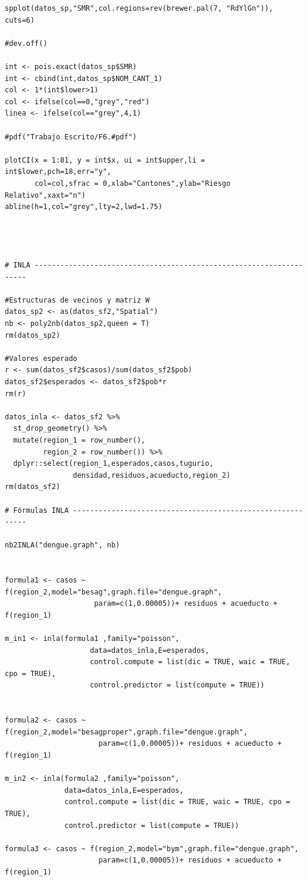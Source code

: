 \documentclass[a4paper,12pt]{report}
\begin{document}
\begin{verbatim}
spplot(datos_sp,"SMR",col.regions=rev(brewer.pal(7, "RdYlGn")), cuts=6)

#dev.off()

int <- pois.exact(datos_sp$SMR)
int <- cbind(int,datos_sp$NOM_CANT_1)
col <- 1*(int$lower>1)
col <- ifelse(col==0,"grey","red")
linea <- ifelse(col=="grey",4,1) 

#pdf("Trabajo Escrito/F6.#pdf")

plotCI(x = 1:81, y = int$x, ui = int$upper,li = int$lower,pch=18,err="y",
       col=col,sfrac = 0,xlab="Cantones",ylab="Riesgo Relativo",xaxt="n")
abline(h=1,col="grey",lty=2,lwd=1.75)




# INLA --------------------------------------------------------------------

#Estructuras de vecinos y matriz W
datos_sp2 <- as(datos_sf2,"Spatial")
nb <- poly2nb(datos_sp2,queen = T)
rm(datos_sp2)

#Valores esperado
r <- sum(datos_sf2$casos)/sum(datos_sf2$pob)
datos_sf2$esperados <- datos_sf2$pob*r
rm(r)

datos_inla <- datos_sf2 %>%
  st_drop_geometry() %>% 
  mutate(region_1 = row_number(),
         region_2 = row_number()) %>% 
  dplyr::select(region_1,esperados,casos,tugurio,
                densidad,residuos,acueducto,region_2) 
rm(datos_sf2)

# Fórmulas INLA -----------------------------------------------------------

nb2INLA("dengue.graph", nb)


formula1 <- casos ~ f(region_2,model="besag",graph.file="dengue.graph",
                     param=c(1,0.00005))+ residuos + acueducto + f(region_1)

m_in1 <- inla(formula1 ,family="poisson",
                    data=datos_inla,E=esperados,
                    control.compute = list(dic = TRUE, waic = TRUE, cpo = TRUE),
                    control.predictor = list(compute = TRUE))


formula2 <- casos ~ f(region_2,model="besagproper",graph.file="dengue.graph",
                      param=c(1,0.00005))+ residuos + acueducto + f(region_1)

m_in2 <- inla(formula2 ,family="poisson",
              data=datos_inla,E=esperados,
              control.compute = list(dic = TRUE, waic = TRUE, cpo = TRUE),
              control.predictor = list(compute = TRUE))

formula3 <- casos ~ f(region_2,model="bym",graph.file="dengue.graph",
                      param=c(1,0.00005))+ residuos + acueducto + f(region_1)


\end{verbatim}
\end{document}
